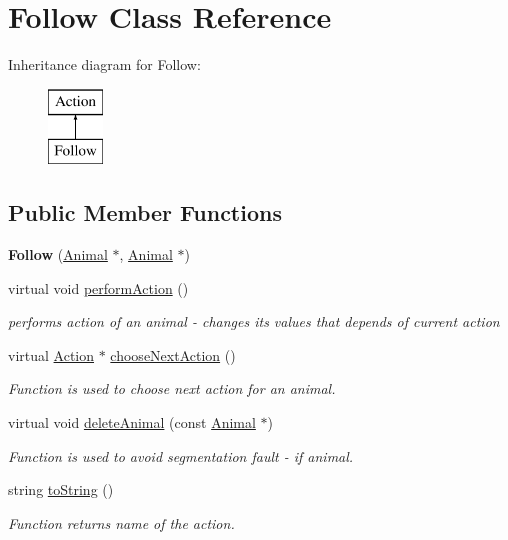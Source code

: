 \hypertarget{class_follow}{}\section{Follow Class Reference}
\label{class_follow}
Inheritance diagram for Follow\+:\begin{figure}[H]
\begin{center}
\leavevmode
\includegraphics[height=2.000000cm]{class_follow}
\end{center}
\end{figure}
\subsection*{Public Member Functions}
\begin{DoxyCompactItemize}
\item 
\hypertarget{class_follow_a6d708596d789fd3845a0c16adf045816}{}{\bfseries Follow} (\hyperlink{class_animal}{Animal} $\ast$, \hyperlink{class_animal}{Animal} $\ast$)\label{class_follow_a6d708596d789fd3845a0c16adf045816}

\item 
virtual void \hyperlink{class_follow_aefc092266387bcddd87aa334c90afcba}{perform\+Action} ()
\begin{DoxyCompactList}\small\item\em performs action of an animal -\/ changes it\textquotesingle{}s values that depends of current action \end{DoxyCompactList}\item 
virtual \hyperlink{class_action}{Action} $\ast$ \hyperlink{class_follow_a32e0774402c8e8885bacb78aefd7abf8}{choose\+Next\+Action} ()
\begin{DoxyCompactList}\small\item\em Function is used to choose next action for an animal. \end{DoxyCompactList}\item 
virtual void \hyperlink{class_follow_a2800c1fe0222144e791750699af6001e}{delete\+Animal} (const \hyperlink{class_animal}{Animal} $\ast$)
\begin{DoxyCompactList}\small\item\em Function is used to avoid segmentation fault -\/ if animal. \end{DoxyCompactList}\item 
string \hyperlink{class_follow_aeec724a51b1a92569c0f3bbeef9b0e34}{to\+String} ()
\begin{DoxyCompactList}\small\item\em Function returns name of the action. \end{DoxyCompactList}\end{DoxyCompactItemize}
